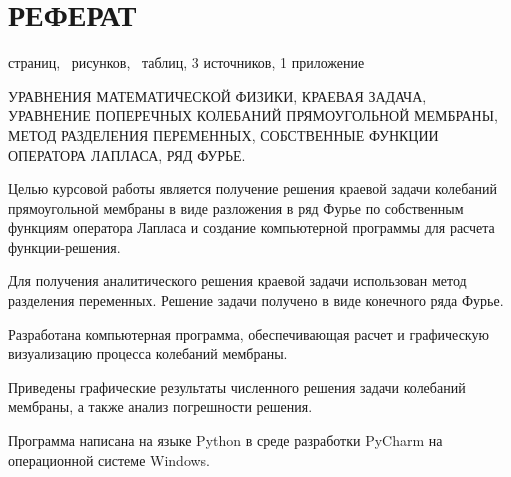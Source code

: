 \section*{РЕФЕРАТ}{
	\begin{center}
	\pageref{LastPage} страниц,
	\totalfigures\ рисунков,
	\totaltables\ таблиц,
	3 источников,
	1 приложение
	\end{center}
	
    \begin{center}
       УРАВНЕНИЯ МАТЕМАТИЧЕСКОЙ ФИЗИКИ, КРАЕВАЯ  ЗАДАЧА, УРАВНЕНИЕ ПОПЕРЕЧНЫХ КОЛЕБАНИЙ  ПРЯМОУГОЛЬНОЙ МЕМБРАНЫ,
        МЕТОД РАЗДЕЛЕНИЯ ПЕРЕМЕННЫХ, СОБСТВЕННЫЕ ФУНКЦИИ ОПЕРАТОРА ЛАПЛАСА, РЯД 
        ФУРЬЕ.     
    \end{center}
    

Целью курсовой работы является получение решения краевой задачи колебаний прямоугольной мембраны в виде разложения в ряд Фурье по собственным функциям оператора Лапласа и создание компьютерной программы для расчета функции-решения.

Для  получения  аналитического  решения  краевой  задачи  использован 
метод разделения переменных. Решение задачи получено в виде конечного ряда Фурье.

Разработана  компьютерная  программа,  обеспечивающая  расчет  и 
графическую  визуализацию  процесса колебаний мембраны.

Приведены  графические  результаты  численного  решения  задачи колебаний мембраны, а также анализ погрешности решения.

Программа  написана  на  языке Python в  среде  разработки PyCharm на операционной системе Windows. 

}

\newpage
\tableofcontents
\newpage
{}
{}


